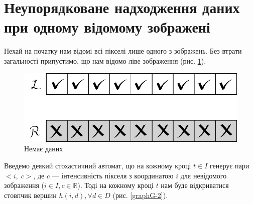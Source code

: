 \section{Неупорядковане надходження даних при одному відомому зображені}
Нехай на початку нам відомі всі пікселі лише одного з зображень. Без втрати загальності припустимо, що нам відомо ліве зображення (рис. \ref{1.3nodata}).
\begin{figure}[h!]
	\centering
	\includegraphics[scale = 0.8]{allclosed.pdf}
	\caption{Немає даних}
	\label{1.3nodata}
\end{figure}
Введемо деякий стохастичний автомат, що на кожному кроці $ t \in I $ генерує пари $<i, \;c>$, де $ c $ --- інтенсивність пікселя з координатою $ i $ для невідомого зображення ($ i \in I, c \in \mathbb{R} $). 
Тоді на кожному кроці $ t $ нам буде відкриватися стовпчик вершин $  h(i, d), \forall d \in D $ (рис. \ref{graphG-2}).
